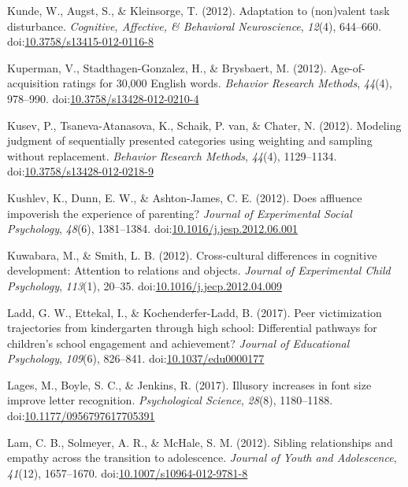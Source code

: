 \documentclass[english,man]{apa6}
\theoremstyle{definition}
\theoremstyle{definition}
\theoremstyle{definition}
\theoremstyle{remark}
\begin{document}
\hypertarget{ref-Kunde2012}{}
Kunde, W., Augst, S., \& Kleinsorge, T. (2012). Adaptation to
(non)valent task disturbance. \emph{Cognitive, Affective, \& Behavioral
Neuroscience}, \emph{12}(4), 644--660.
doi:\href{https://doi.org/10.3758/s13415-012-0116-8}{10.3758/s13415-012-0116-8}

\hypertarget{ref-Kuperman2012}{}
Kuperman, V., Stadthagen-Gonzalez, H., \& Brysbaert, M. (2012).
Age-of-acquisition ratings for 30,000 English words. \emph{Behavior
Research Methods}, \emph{44}(4), 978--990.
doi:\href{https://doi.org/10.3758/s13428-012-0210-4}{10.3758/s13428-012-0210-4}

\hypertarget{ref-Kusev2012}{}
Kusev, P., Tsaneva-Atanasova, K., Schaik, P. van, \& Chater, N. (2012).
Modeling judgment of sequentially presented categories using weighting
and sampling without replacement. \emph{Behavior Research Methods},
\emph{44}(4), 1129--1134.
doi:\href{https://doi.org/10.3758/s13428-012-0218-9}{10.3758/s13428-012-0218-9}

\hypertarget{ref-Kushlev2012}{}
Kushlev, K., Dunn, E. W., \& Ashton-James, C. E. (2012). Does affluence
impoverish the experience of parenting? \emph{Journal of Experimental
Social Psychology}, \emph{48}(6), 1381--1384.
doi:\href{https://doi.org/10.1016/j.jesp.2012.06.001}{10.1016/j.jesp.2012.06.001}

\hypertarget{ref-Kuwabara2012}{}
Kuwabara, M., \& Smith, L. B. (2012). Cross-cultural differences in
cognitive development: Attention to relations and objects. \emph{Journal
of Experimental Child Psychology}, \emph{113}(1), 20--35.
doi:\href{https://doi.org/10.1016/j.jecp.2012.04.009}{10.1016/j.jecp.2012.04.009}

\hypertarget{ref-Ladd2017}{}
Ladd, G. W., Ettekal, I., \& Kochenderfer-Ladd, B. (2017). Peer
victimization trajectories from kindergarten through high school:
Differential pathways for children's school engagement and achievement?
\emph{Journal of Educational Psychology}, \emph{109}(6), 826--841.
doi:\href{https://doi.org/10.1037/edu0000177}{10.1037/edu0000177}

\hypertarget{ref-Lages2017}{}
Lages, M., Boyle, S. C., \& Jenkins, R. (2017). Illusory increases in
font size improve letter recognition. \emph{Psychological Science},
\emph{28}(8), 1180--1188.
doi:\href{https://doi.org/10.1177/0956797617705391}{10.1177/0956797617705391}

\hypertarget{ref-Lam2012}{}
Lam, C. B., Solmeyer, A. R., \& McHale, S. M. (2012). Sibling
relationships and empathy across the transition to adolescence.
\emph{Journal of Youth and Adolescence}, \emph{41}(12), 1657--1670.
doi:\href{https://doi.org/10.1007/s10964-012-9781-8}{10.1007/s10964-012-9781-8}
\end{document}
